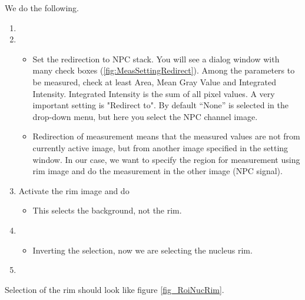 We do the following.

\begin{enumerate}
  \item {}
  \item {}

\begin{itemize}
    \item Set the redirection to NPC stack. You will see a dialog window with many check boxes (\ref{fig:MeasSettingRedirect}). Among the parameters to be measured, check at least Area, Mean Gray Value and Integrated Intensity. Integrated Intensity is the sum of all pixel values. A very important setting is "Redirect to". By default ``None'' is selected in the drop-down menu, but here you select the NPC channel image.
    \item Redirection of measurement means that the measured values are not from currently active image, but from another image specified in the setting window. In our case, we want to specify the region for measurement using rim image and do the measurement in the other image (NPC signal). 
  
\end{itemize}
  \item Activate the rim image and do 

\begin{itemize}
    \item This selects the background, not the rim. 
  
\end{itemize}
  \item {}

\begin{itemize}
    \item Inverting the selection, now we are selecting the nucleus rim. 
  
\end{itemize}
  \item {}

\end{enumerate}

Selection of the rim should look like figure \ref{fig_RoiNucRim}.